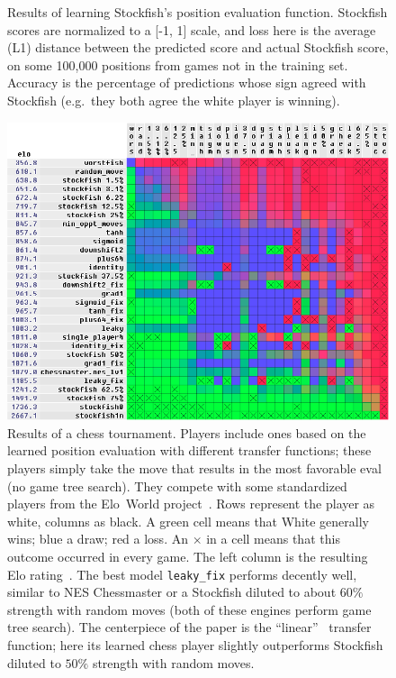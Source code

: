 \documentclass[twocolumn]{article}
\begin{document}
\begin{figure}[htp]
  \begin{center}
    
  \end{center}
  \caption{
    Results of learning Stockfish's position evaluation function.
    Stockfish scores are normalized to a [-1, 1] scale, and loss
    here is the average (L1) distance between the predicted score
    and actual Stockfish score, on some 100,000 positions from
    games not in the training set. Accuracy is the percentage of
    predictions whose sign agreed with Stockfish (e.g.~they both
    agree the white player is winning).
  } \label{fig:chessresults}
\end{figure}

\begin{figure}[htp]
  \begin{center}
    \includegraphics[width=\linewidth]{elo}
  \end{center}
  \caption{ Results of a chess tournament. Players include ones based
    on the learned position evaluation with different transfer
    functions; these players simply take the move that results in the
    most favorable eval (no game tree search). They compete with some
    standardized players from the Elo~World
    project~\cite{murphy2019eloworld}. Rows represent the player as
    white, columns as black. A green cell means that White generally
    wins; blue a draw; red a loss. An $\times$ in a cell means that
    this outcome occurred in every game. The left column is the
    resulting Elo rating~\cite{elo1978rating}. The best model
    {\tt leaky\_fix} performs decently well, similar to NES Chessmaster
    or a Stockfish diluted to about $60\%$ strength with random
    moves (both of these engines perform game tree search). The
    centerpiece of the paper is the ``linear'' \gradone\ transfer
    function; here its learned chess player slightly outperforms
    Stockfish diluted to $50\%$ strength with random moves.
  } \label{fig:elo}
\end{figure}
\end{document}
